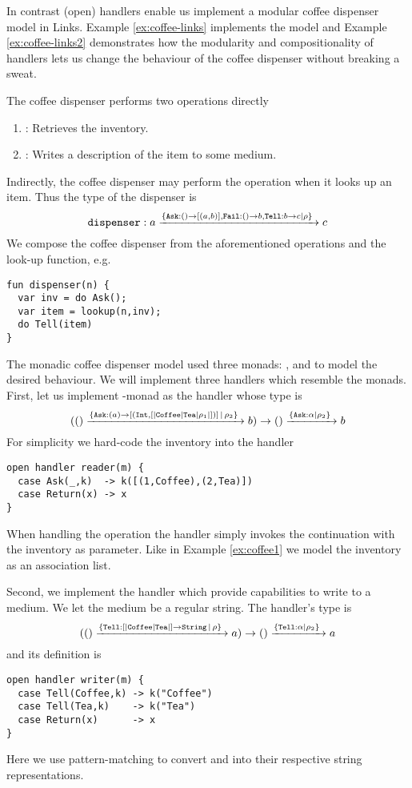 In contrast (open) handlers enable us implement a modular coffee dispenser model in Links. Example \ref{ex:coffee-links} implements the model and Example \ref{ex:coffee-links2} demonstrates how the modularity and compositionality of handlers lets us change the behaviour of the coffee dispenser without breaking a sweat.
\begin{example}\label{ex:coffee-links}
The coffee dispenser performs two operations directly
\begin{enumerate}
  \item {}: Retrieves the inventory.
  \item {}: Writes a description of the item to some medium.
\end{enumerate}
Indirectly, the coffee dispenser may perform the  operation when it looks up an item. Thus the type of the dispenser is 
\[ \texttt{dispenser} : a \xrightarrow{\{\texttt{Ask}:() \to [(a, b)], \texttt{Fail}:() \to b,\texttt{Tell}:b \to c| \rho\}\;} c \]
We compose the coffee dispenser from the aforementioned operations and the look-up function, e.g.
\begin{lstlisting}[style=links]
fun dispenser(n) {
  var inv = do Ask();
  var item = lookup(n,inv);
  do Tell(item)
}
\end{lstlisting}
The monadic coffee dispenser model used three monads: ,  and  to model the desired behaviour. We will implement three handlers which resemble the monads. First, let us implement -monad as the handler  whose type is 
\[  (() \xrightarrow{\{\texttt{Ask}:(a) \to [(\texttt{Int}, [|\texttt{Coffee}|\texttt{Tea}|\rho_1|])] \, | \,\rho_2\}\;} b) \to () \xrightarrow{\{\texttt{Ask}:\alpha|\rho_2\}\;} b \]
For simplicity we hard-code the inventory into the handler
\begin{lstlisting}[style=links]
open handler reader(m) {
  case Ask(_,k)  -> k([(1,Coffee),(2,Tea)])
  case Return(x) -> x
}
\end{lstlisting}
When handling the operation  the handler simply invokes the continuation  with the inventory as parameter. Like in Example \ref{ex:coffee1} we model the inventory as an association list.

Second, we implement the handler  which provide capabilities to write to a medium. We let the medium be a regular string. The handler's type is
\[  (() \xrightarrow{\{\texttt{Tell}: [|\texttt{Coffee}|\texttt{Tea}|] \to \texttt{String} \, | \,\rho\}\;} a) \to () \xrightarrow{\{\texttt{Tell}:\alpha|\rho_2\}\;} a \]
and its definition is
\begin{lstlisting}[style=links]
open handler writer(m) {
  case Tell(Coffee,k) -> k("Coffee")
  case Tell(Tea,k)    -> k("Tea")
  case Return(x)      -> x
}
\end{lstlisting}
Here we use pattern-matching to convert  and  into their respective string representations.


\end{example}
